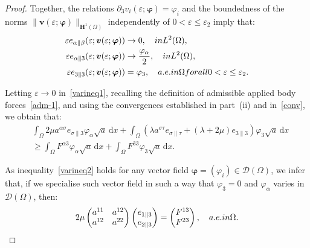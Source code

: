 \documentclass{amsart}
\def\dd{\, \mathrm{d}}
\begin{document}
\begin{proof}
Together, the relations $\partial_3 v_i(\varepsilon;\bm{\varphi})=\varphi_i$ and the boundedness of the norms $\|\bm{v}(\varepsilon;\bm{\varphi})\|_{\bm{H}^1(\Omega)}$ independently of $0<\varepsilon\le\varepsilon_2$ imply that:
\begin{equation}
	\label{conv}
	\begin{aligned}
		\varepsilon e_{\alpha\|\beta}(\varepsilon;\bm{v}(\varepsilon;\bm{\varphi})) & \to 0,\quad\textup{ in }L^2(\Omega),\\
		\varepsilon e_{\alpha\|3}(\varepsilon;\bm{v}(\varepsilon;\bm{\varphi})) & \to \dfrac{\varphi_\alpha}{2},\quad\textup{ in }L^2(\Omega),\\
		\varepsilon e_{3\|3}(\varepsilon;\bm{v}(\varepsilon;\bm{\varphi})) &= \varphi_3,\quad\textup{ a.e. in }\Omega \textup{ for all }0<\varepsilon\le\varepsilon_2.
	\end{aligned}
\end{equation}

Letting $\varepsilon\to0$ in~\eqref{varineq1}, recalling the definition of admissible applied body forces~\eqref{adm-1}, and using the convergences established in part~(ii) and in~\eqref{conv}, we obtain that:
\begin{equation}
\label{varineq2}
\begin{aligned}
	&\int_{\Omega}2\mu a^{\alpha\sigma} e_{\sigma\|3} \varphi_\alpha 
	\sqrt{a} \dd x +\int_{\Omega}\left(\lambda a^{\sigma\tau}e_{\sigma\|\tau}+(\lambda+2\mu)e_{3\|3}\right) \varphi_3 \sqrt{a} \dd x\\
	&\ge \int_{\Omega} F^{\alpha3} \varphi_\alpha \sqrt{a} \dd x + \int_{\Omega} F^{33} \varphi_3 \sqrt{a} \dd x.
\end{aligned}
\end{equation}

As inequality~\eqref{varineq2} holds for any vector field $\bm{\varphi}=(\varphi_i) \in\bm{\mathcal{D}}(\Omega)$, we infer that, if we specialise such vector field in such a way that $\varphi_3=0$ and $\varphi_\alpha$ varies in $\mathcal{D}(\Omega)$, then:
\begin{equation*}
2\mu
\begin{pmatrix}
	a^{11}&a^{12}\\
	a^{12}&a^{22}
\end{pmatrix}
\begin{pmatrix}
	e_{1\|3}\\
	e_{2\|3}
\end{pmatrix}
=
\begin{pmatrix}
F^{13}\\
F^{23}
\end{pmatrix},\quad\textup{ a.e. in }\Omega.
\end{equation*}


\end{proof}
\end{document}
